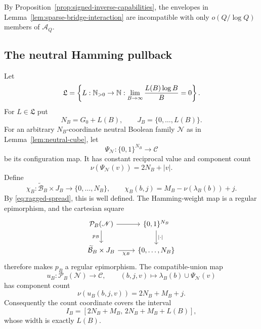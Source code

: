 By Proposition~\ref{prop:signed-inverse-capabilities}, the envelopes in Lemma~\ref{lem:sparse-bridge-interaction} are incompatible with only $o(Q/\log Q)$ members of $\mathcal A_Q$.

\subsection{The neutral Hamming pullback}

Let
\begin{equation}\label{eq:startup-function-class}
\mathfrak L=
\left\{
L:\mathbb N_{>0}\to\mathbb N:
\lim_{B\to\infty}\frac{L(B)\log B}{B}=0
\right\}.
\end{equation}
For $L\in\mathfrak L$ put
\[
N_B=G_0+L(B),
\qquad
J_B=\{0,\ldots,L(B)\}.
\]
For an arbitrary $N_B$-coordinate neutral Boolean family $\mathscr N$ as in Lemma~\ref{lem:neutral-cube}, let
\[
\Psi_{\mathscr N}:\{0,1\}^{N_B}\longrightarrow\mathcal C
\]
be its configuration map.  It has constant reciprocal value and component count
\[
\nu(\Psi_{\mathscr N}(v))=2N_B+|v|.
\]
Define
\[
\chi_B:\widetilde{\mathcal B}_B\times J_B\longrightarrow\{0,\ldots,N_B\},
\qquad
\chi_B(b,j)=M_B-\nu(\lambda_B(b))+j.
\]
By \eqref{eq:ragged-spread}, this is well defined.  The Hamming-weight map is a regular epimorphism, and the cartesian square
\begin{equation}\label{eq:hamming-pullback}
\begin{tikzcd}
\mathcal P_B(\mathscr N) \arrow[r] \arrow[d,"{p_B}"']
  & \{0,1\}^{N_B} \arrow[d,"{|\cdot|}"]\\
\widetilde{\mathcal B}_B\times J_B \arrow[r,"{\chi_B}"']
  & \{0,\ldots,N_B\}
\end{tikzcd}
\end{equation}
therefore makes $p_B$ a regular epimorphism.  The compatible-union map
\[
u_B:\mathcal P_B(\mathscr N)\longrightarrow\mathcal C,
\qquad
(b,j,v)\longmapsto \lambda_B(b)\cup\Psi_{\mathscr N}(v)
\]
has component count
\[
\nu(u_B(b,j,v))
=2N_B+M_B+j.
\]
Consequently the count coordinate covers the interval
\begin{equation}\label{eq:common-count-interval}
I_B=[2N_B+M_B,\,2N_B+M_B+L(B)],
\end{equation}
whose width is exactly $L(B)$.

